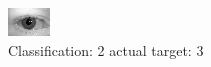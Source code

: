 \begin{figure}[h!]
\begin{center}
\includegraphics[width=0.60\columnwidth]{figures/ID610_class_2_target_3.png}
\end{center}
\caption{ Classification: 2 actual target: 3}
\label{fig:ID610_class_2_target_3}
\end{figure}
